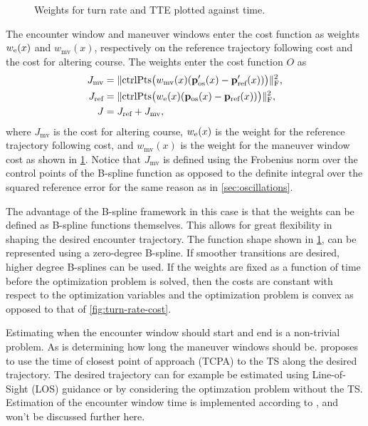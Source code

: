 \begin{figure}
    \centering
    
    \caption{Weights for turn rate and TTE plotted against time.}
    \label{fig:maneuver-window}
\end{figure}

The encounter window and maneuver windows enter the cost function as weights $w_\text e(x)$ and $w_\text{mv}(x)$, respectively on the reference trajectory following cost and the cost for altering course. The weights enter the cost function $O$ as
\begin{subequations}\label{eq:cost-maneuver-window}
    \begin{align}
        J_\text{mv} &= \|\text{ctrlPts}\big(w_\text{mv}(x)(\mathbf p'_\text{os}(x) - \mathbf p'_\text{ref}(x))\big)\|_\text{F}^2, \label{eq:cost-maneuver-window-mv}\\
        J_\text{ref} &= \|\text{ctrlPts}\big(w_\text e(x)(\mathbf p_\text{os}(x) - \mathbf p_\text{ref}(x))\big)\|_\text{F}^2, \label{eq:cost-maneuver-window-ref}\\
        J &= J_\text{ref} + J_\text{mv}, \label{eq:cost-maneuver-window-total}
    \end{align}
\end{subequations}
where $J_\text{mv}$ is the cost for altering course, $w_\text e(x)$ is the weight for the reference trajectory following cost, and $w_\text{mv}(x)$ is the weight for the maneuver window cost as shown in \cref{fig:maneuver-window}. Notice that $J_\text{mv}$ is defined using the Frobenius norm over the control points of the B-spline function as opposed to the definite integral over the squared reference error for the same reason as in \cref{sec:oscillations}.

The advantage of the B-spline framework in this case is that the weights can be defined as B-spline functions themselves. This allows for great flexibility in shaping the desired encounter trajectory. The function shape shown in \cref{fig:maneuver-window}, can be represented using a zero-degree B-spline. If smoother transitions are desired, higher degree B-splines can be used.
If the weights are fixed as a function of time before the optimization problem is solved, then the costs are constant with respect to the optimization variables and the optimization problem is convex as opposed to that of \cref{fig:turn-rate-cost}.

Estimating when the encounter window should start and end is a non-trivial problem. As is determining how long the maneuver windows should be. \cite{Thyri2022-MPC} proposes to use the time of closest point of approach (TCPA) to the TS along the desired trajectory. The desired trajectory can for example be estimated using Line-of-Sight (LOS) guidance \citep{Fossen2011-Handbook} or by considering the optimzation problem without the TS. Estimation of the encounter window time is implemented according to \cite{Thyri2022-MPC}, and won't be discussed further here.


